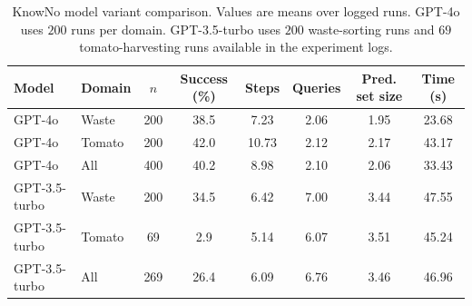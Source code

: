 \begin{table}[t]
\centering
\caption{KnowNo model variant comparison. Values are means over logged runs. GPT-4o uses $200$ runs per domain. GPT-3.5-turbo uses $200$ waste-sorting runs and $69$ tomato-harvesting runs available in the experiment logs.}
\label{tab:app_knowno_model_compare}
\small
\setlength{\tabcolsep}{4pt}
\begin{tabular*}{\textwidth}{@{\extracolsep{\fill}}llcccccc}
\toprule
\textbf{Model} & \textbf{Domain} & \textbf{$n$} & \textbf{Success (\%)} & \textbf{Steps} & \textbf{Queries} & \textbf{Pred. set size} & \textbf{Time (s)} \\
\midrule
GPT-4o & Waste & 200 & 38.5 & 7.23 & 2.06 & 1.95 & 23.68 \\
GPT-4o & Tomato & 200 & 42.0 & 10.73 & 2.12 & 2.17 & 43.17 \\
GPT-4o & All & 400 & 40.2 & 8.98 & 2.10 & 2.06 & 33.43 \\
\midrule
GPT-3.5-turbo & Waste & 200 & 34.5 & 6.42 & 7.00 & 3.44 & 47.55 \\
GPT-3.5-turbo & Tomato & 69 & 2.9 & 5.14 & 6.07 & 3.51 & 45.24 \\
GPT-3.5-turbo & All & 269 & 26.4 & 6.09 & 6.76 & 3.46 & 46.96 \\
\bottomrule
\end{tabular*}
\end{table}
